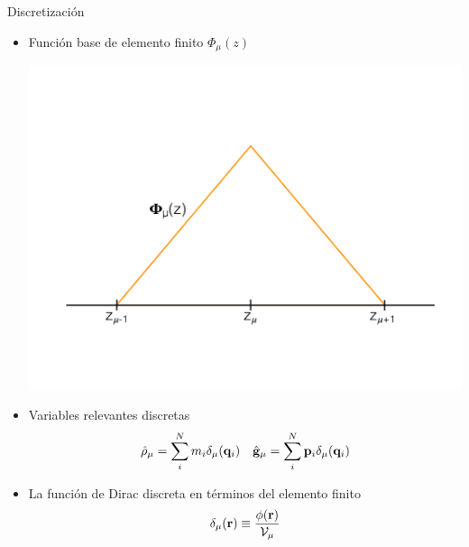 \documentclass{beamer}
\begin{document}
\begin{frame}{Discretización}
  \begin{itemize}
    \item<1-> Función base de elemento finito $\Phi_{\mu}(z)$
    \begin{center} 
      \includegraphics[width = 0.5\linewidth]{psichi-defensa}
    \end{center}
  \item<2-> Variables relevantes discretas
\begin{align}
  \hat{\rho}_\mu= \sum_i^Nm_i\delta_\mu({\bf q}_i) &&
\hat{\bf g}_\mu= \sum_i^N{\bf p}_i\delta_\mu({\bf q}_i)
\nonumber
\end{align}
\item<3-> La función de Dirac discreta en términos del elemento finito
  \begin{align}
    \delta_{\mu}({\bf r}) \equiv \frac{\phi({\bf r})}{{\cal V}_{\mu}}
    \nonumber
  \end{align}
\end{itemize}

\end{frame}
\end{document}
